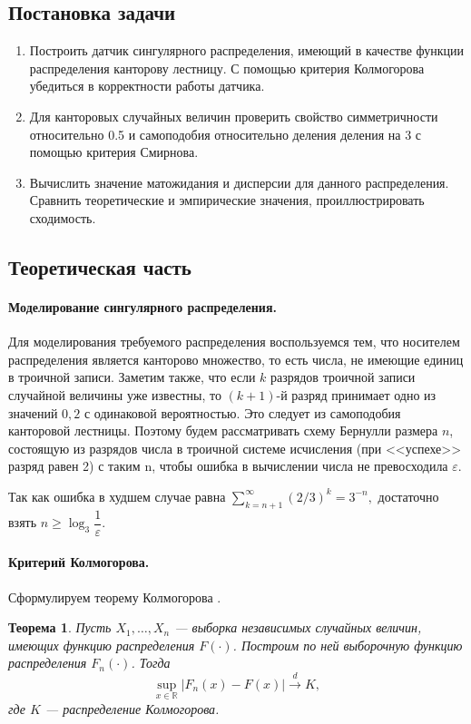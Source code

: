 \documentclass[16pt]{article}
\newtheorem{Th}{Теорема}
\newcommand\Real{\mathbb{R}}
\newcommand\A{(\cdot)}
\begin{document}
\subsection{Постановка задачи}
\begin{enumerate}
\item Построить датчик сингулярного распределения, имеющий в качестве функции распределения канторову лестницу. С помощью критерия Колмогорова убедиться в корректности работы датчика.
\item Для канторовых случайных величин проверить свойство симметричности относительно 0.5 и самоподобия относительно деления деления на 3 с помощью критерия Смирнова.
\item Вычислить значение матожидания и дисперсии для данного распределения. Сравнить теоретические и эмпирические значения, проиллюстрировать сходимость.
\end{enumerate}

\subsection{Теоретическая часть}

\paragraph{Моделирование сингулярного распределения.}

Для моделирования требуемого распределения воспользуемся тем, что носителем распределения является канторово множество, то есть числа, не имеющие единиц в троичной записи. Заметим также, что если $k$ разрядов троичной записи случайной величины уже известны, то $(k+1)$-й разряд принимает одно из значений $0, 2$ с одинаковой вероятностью. Это следует из самоподобия канторовой лестницы. Поэтому будем рассматривать схему Бернулли размера $n$, состоящую из разрядов числа в троичной системе исчисления (при <<успехе>> разряд равен 2) с таким n, чтобы ошибка в вычислении числа не превосходила $\varepsilon$.

Так как ошибка в худшем случае равна
$ \sum\limits_{k=n+1}^\infty\left(2/3\right)^{k} = 3^{-n},$
достаточно взять $n \geq \log_3 \dfrac{1}{\varepsilon}$.

\paragraph{Критерий Колмогорова.}
Сформулируем теорему Колмогорова \cite{Kolm}. 
\begin{Th}
Пусть $X_1, \ldots, X_n$ --- выборка независимых случайных величин, имеющих функцию распределения $F\A$. Построим по ней выборочную функцию распределения $F_n\A$. Тогда $$\sup_{x \in \Real}|F_n(x) - F(x)| \overset{d}{\to} K,$$
где $K$ --- распределение Колмогорова.
\end{Th}
\end{document}
